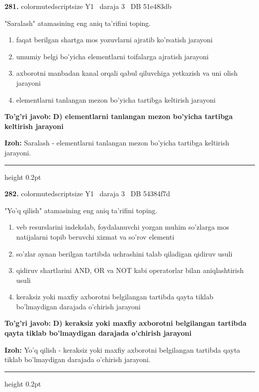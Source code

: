 \documentclass[10pt,a4paper,oneside]{article}
\begin{document}
\noindent\textbf{\color{ink}281.}  {color{muted}scriptsize Y1 \textbullet\ daraja 3 \textbullet\ DB 51e483db}
\par
"Saralash" atamasining eng aniq ta'rifini toping.
\begin{enumerate}[label=\Alph*),leftmargin=9mm]
\item faqat berilgan shartga mos yozuvlarni ajratib ko'rsatish jarayoni
\item umumiy belgi bo'yicha elementlarni toifalarga ajratish jarayoni
\item axborotni manbadan kanal orqali qabul qiluvchiga yetkazish va uni olish jarayoni
\item elementlarni tanlangan mezon bo'yicha tartibga keltirish jarayoni
\end{enumerate}
\begin{tcolorbox}[enhanced,breakable,colback=teal!4,colframe=teal!50!black,boxrule=0.5pt,arc=1.1mm,left=3mm,right=3mm,top=1.7mm,bottom=1.7mm,before skip=2mm,after skip=2mm]
\textbf{\color{teal}To'g'ri javob:} \textbf{D) elementlarni tanlangan mezon bo'yicha tartibga keltirish jarayoni}
\par\smallskip
\textbf{Izoh:} Saralash - elementlarni tanlangan mezon bo'yicha tartibga keltirish jarayoni.
\end{tcolorbox}
\vspace{2mm}\hrule height 0.2pt \vspace{3mm}

\noindent\textbf{\color{ink}282.}  {color{muted}scriptsize Y1 \textbullet\ daraja 3 \textbullet\ DB 54384f7d}
\par
"Yo'q qilish" atamasining eng aniq ta'rifini toping.
\begin{enumerate}[label=\Alph*),leftmargin=9mm]
\item veb resurslarini indekslab, foydalanuvchi yozgan muhim so'zlarga mos natijalarni topib beruvchi xizmat va so'rov elementi
\item so'zlar aynan berilgan tartibda uchrashini talab qiladigan qidiruv usuli
\item qidiruv shartlarini AND, OR va NOT kabi operatorlar bilan aniqlashtirish usuli
\item keraksiz yoki maxfiy axborotni belgilangan tartibda qayta tiklab bo'lmaydigan darajada o'chirish jarayoni
\end{enumerate}
\begin{tcolorbox}[enhanced,breakable,colback=teal!4,colframe=teal!50!black,boxrule=0.5pt,arc=1.1mm,left=3mm,right=3mm,top=1.7mm,bottom=1.7mm,before skip=2mm,after skip=2mm]
\textbf{\color{teal}To'g'ri javob:} \textbf{D) keraksiz yoki maxfiy axborotni belgilangan tartibda qayta tiklab bo'lmaydigan darajada o'chirish jarayoni}
\par\smallskip
\textbf{Izoh:} Yo'q qilish - keraksiz yoki maxfiy axborotni belgilangan tartibda qayta tiklab bo'lmaydigan darajada o'chirish jarayoni.
\end{tcolorbox}
\vspace{2mm}\hrule height 0.2pt \vspace{3mm}
\end{document}
